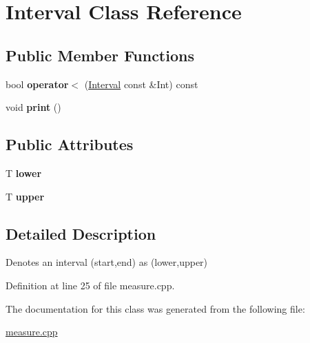 \hypertarget{classInterval}{}\section{Interval Class Reference}
\label{classInterval}
\subsection*{Public Member Functions}
\begin{DoxyCompactItemize}
\item 
\mbox{\label{classInterval_abfbe77932f9ffa94b5887253c37b1a19}} 
bool {\bfseries operator$<$} (\hyperlink{classInterval}{Interval} const \&Int) const
\item 
\mbox{\label{classInterval_a3c5b549e7dcff526f13fcdb28d5c10cf}} 
void {\bfseries print} ()
\end{DoxyCompactItemize}
\subsection*{Public Attributes}
\begin{DoxyCompactItemize}
\item 
\mbox{\label{classInterval_a4f59d167f721e715639f6e557a343d46}} 
T {\bfseries lower}
\item 
\mbox{\label{classInterval_ad84903b542d3a196d94f8503a199f291}} 
T {\bfseries upper}
\end{DoxyCompactItemize}


\subsection{Detailed Description}
Denotes an interval (start,end) as (lower,upper) 

Definition at line 25 of file measure.\+cpp.



The documentation for this class was generated from the following file\+:\begin{DoxyCompactItemize}
\item 
\hyperlink{measure_8cpp}{measure.\+cpp}\end{DoxyCompactItemize}
